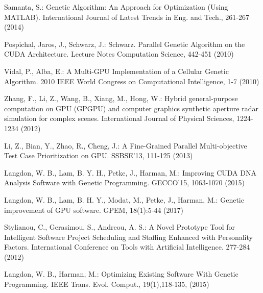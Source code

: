 \begin{thebibliography}{}
Samanta, S.:
Genetic Algorithm: An Approach for Optimization (Using MATLAB). 
International Journal of Latest Trends in Eng. and Tech., 261-267 (2014)


Pospichal, Jaros, J., Schwarz, J.:
Schwarz. Parallel Genetic Algorithm on the CUDA Architecture.
Lecture Notes Computation Science, 442-451 (2010)

Vidal, P., Alba, E.:
A Multi-GPU Implementation of a Cellular Genetic Algorithm.
2010 IEEE World Congress on Computational Intelligence, 1-7 (2010)

Zhang, F., Li, Z., Wang, B., Xiang, M., Hong, W.:
Hybrid general-purpose computation on GPU (GPGPU) and computer graphics synthetic aperture radar simulation for complex scenes.
International Journal of Physical Sciences, 1224-1234 (2012)

Li, Z., Bian, Y., Zhao, R., Cheng, J.:
A Fine-Grained Parallel Multi-objective Test Case Prioritization on GPU.
SSBSE'13, 111-125 (2013)

Langdon, W. B., Lam, B. Y. H., Petke, J., Harman, M.:
Improving CUDA DNA Analysis Software with Genetic Programming.
GECCO'15, 1063-1070 (2015)

Langdon, W. B., Lam, B. H. Y., Modat, M., Petke, J., Harman, M.:
Genetic improvement of GPU software.
GPEM, 18(1):5-44 (2017)

Stylianou, C., Gerasimou, S., Andreou, A. S.:
A Novel Prototype Tool for Intelligent Software 
Project Scheduling and Staffing Enhanced with Personality Factors.
International Conference on Tools with Artificial Intelligence. 277-284 (2012)

Langdon, W. B., Harman, M.:
Optimizing Existing Software With Genetic Programming.
IEEE Trans. Evol. Comput., 19(1),118-135, (2015)












\end{thebibliography}
\clearpage

